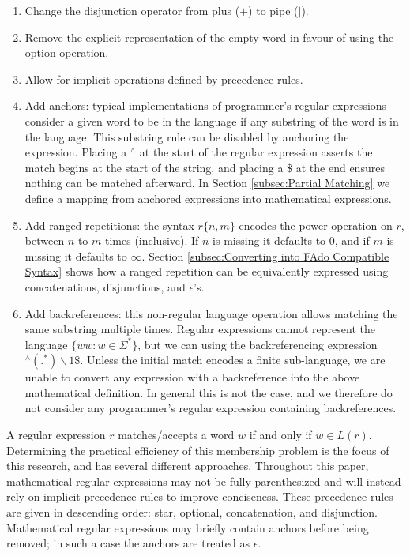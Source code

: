 \begin{enumerate}
  \item Change the disjunction operator from plus ($+$) to pipe ($|$).
  \item Remove the explicit representation of the empty word in favour of using the option operation.
  \item Allow for implicit operations defined by precedence rules.
  \item Add anchors: typical implementations of programmer's regular expressions consider a given word to be in the language if any substring of the word is in the language. This substring rule can be disabled by anchoring the expression. Placing a $^\wedge$ at the start of the regular expression asserts the match begins at the start of the string, and placing a $\$$ at the end ensures nothing can be matched afterward. In Section \ref{subsec:Partial Matching} we define a mapping from anchored expressions into mathematical expressions.
  \item Add ranged repetitions: the syntax $r\{n,m\}$ encodes the power operation on $r$, between $n$ to $m$ times (inclusive). If $n$ is missing it defaults to 0, and if $m$ is missing it defaults to $\infty$. Section \ref{subsec:Converting into FAdo Compatible Syntax} shows how a ranged repetition can be equivalently expressed using concatenations, disjunctions, and $\epsilon$'s.
  \item Add backreferences: this non-regular language operation allows matching the same substring multiple times. Regular expressions cannot represent the language $\{ww : w \in \Sigma^*\}$, but we can using the backreferencing expression $^\wedge (.^*)\backslash 1 \$$. Unless the initial match encodes a finite sub-language, we are unable to convert any expression with a backreference into the above mathematical definition. In general this is not the case, and we therefore do not consider any programmer's regular expression containing backreferences.
\end{enumerate}

A regular expression $r$ matches/accepts a word $w$ if and only if $w \in L(r)$. Determining the practical efficiency of this membership problem is the focus of this research, and has several different approaches. Throughout this paper, mathematical regular expressions may not be fully parenthesized and will instead rely on implicit precedence rules to improve conciseness. These precedence rules are given in descending order: star, optional, concatenation, and disjunction. Mathematical regular expressions may briefly contain anchors before being removed; in such a case the anchors are treated as $\epsilon$.

